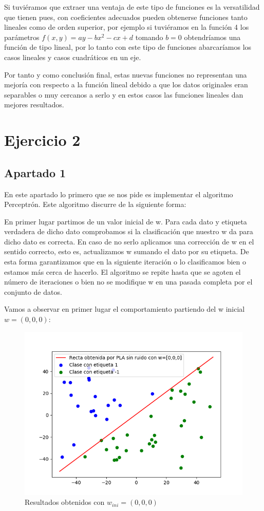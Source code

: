 \documentclass[12pt,a4paper]{article}
\begin{document}
Si tuviéramos que extraer una ventaja de este tipo de funciones es la versatilidad que tienen pues, con coeficientes adecuados pueden obtenerse funciones tanto lineales como de orden superior, por ejemplo si tuviéramos en la función 4 los parámetros $f(x,y) = ay-bx^2 - cx + d$ tomando $b=0$ obtendríamos una función de tipo lineal, por lo tanto con este tipo de funciones abarcaríamos los casos lineales y casos cuadráticos en un eje.

Por tanto y como conclusión final, estas nuevas funciones no representan una mejoría con respecto a la función lineal debido a que los datos originales eran separables o muy cercanos a serlo y en estos casos las funciones lineales dan mejores resultados.

\section{Ejercicio 2}

\subsection{Apartado 1}

En este apartado lo primero que se nos pide es implementar el algoritmo Perceptrón. Este algoritmo discurre de la siguiente forma:

En primer lugar partimos de un valor inicial de w. Para cada dato y etiqueta verdadera de dicho dato comprobamos si la clasificación que nuestro w da para dicho dato es correcta. En caso de no serlo aplicamos una corrección de w en el sentido correcto, esto es, actualizamos w sumando el dato por su etiqueta. De esta forma garantizamos que en la siguiente iteración o lo clasificamos bien o estamos más cerca de hacerlo. El algoritmo se repite hasta que se agoten el número de iteraciones o bien no se modifique w en una pasada completa por el conjunto de datos.

Vamos a observar en primer lugar el comportamiento partiendo del w inicial $w=(0,0,0)$:

\begin{figure}[H]
	\centering
	\includegraphics[scale=0.8]{./Imagenes/ej2-1.png}
	\caption{Resultados obtenidos con $w_{ini}=(0,0,0)$}
\end{figure}
\end{document}
